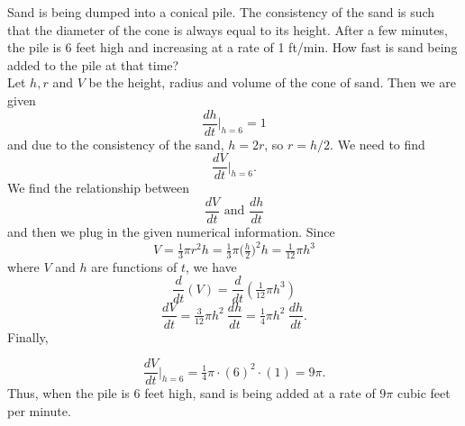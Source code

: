 \documentclass{ximera}
\begin{document}
\begin{example}[example 14]
Sand is being dumped into a conical pile. The consistency of the sand is such that the 
diameter of the cone is always equal to its height. After a few minutes,  the pile is 6 feet high and
increasing at a rate of 1 ft/min. How fast is sand being added to the pile at that time?\\

Let $h, r$ and $V$ be the height, radius and volume of the cone of sand. Then we are given
\[\frac{dh}{dt}\bigg|_{h = 6} = 1\]
and due to the consistency of the sand, $h = 2r$, so $r = h/2$.
We need to find 
\[\frac{dV}{dt}\bigg|_{h = 6}.\]
We find the relationship between 
\[\frac{dV}{dt} \text{ and } \frac{dh}{dt}\]
and then we plug in the given numerical information.
Since 
\[V = \tfrac13 \pi r^2 h = \tfrac13 \pi \big(\tfrac{h}{2}\big)^2 h = \tfrac{1}{12}\pi h^3\]
where $V$ and $h$ are functions of $t$, we have
\[\frac{d}{dt}(V) = \frac{d}{dt}(\tfrac{1}{12}\pi h^3)\]
\[\frac{dV}{dt} = \tfrac{3}{12}\pi h^2 \  \frac{dh}{dt} = \tfrac{1}{4}\pi h^2 \ \frac{dh}{dt}.\]
Finally,

\[\frac{dV}{dt}\bigg|_{h = 6} = \tfrac{1}{4}\pi \cdot (6)^2 \cdot(1) = 9\pi.\]
Thus, when the pile is 6 feet high, sand is being added at a rate of $9\pi$ cubic feet per minute.
\end{example}


\begin{center}
\begin{foldable}
\end{foldable}
\end{center}
\end{document}
